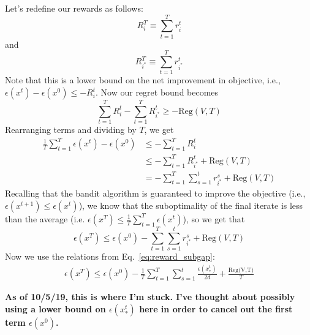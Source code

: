 \documentclass[letterpaper]{article}
\newcommand{\istar}{i^*}
\begin{document}
Let's redefine our rewards as follows:
\begin{equation}
    R_i^T \equiv \sum_{t=1}^T r_i^t
\end{equation}
and
\begin{equation}
    R_{\istar}^T \equiv \sum_{t=1}^T r_{\istar}^t
\end{equation}
Note that this is a lower bound on the net improvement in objective, i.e., $\epsilon(x^t) - \epsilon(x^0) \leq -R_i^t$. Now our regret bound becomes
\begin{equation}
    \sum_{t=1}^T R_i^t -\sum_{t=1}^T R_{\istar}^t \geq -\text{Reg}(V,T)
\end{equation}
Rearranging terms and dividing by $T$, we get
\begin{align}
    \frac{1}{T}\sum_{t=1}^T \epsilon(x^t) - \epsilon(x^0) &\leq -\sum_{t=1}^T R_i^t \\
    &\leq -\sum_{t=1}^T R_{\istar}^t + \text{Reg}(V,T)\\
    &= -\sum_{t=1}^T \sum_{s=1}^t r_{\istar}^s + \text{Reg}(V,T)
\end{align}
Recalling that the bandit algorithm is guaranteed to improve the objective (i.e., $\epsilon(x^{t+1}) \leq \epsilon(x^t)$), we know that the suboptimality of the final iterate is less than the average (i.e. $\epsilon(x^T) \leq \frac{1}{T} \sum_{t=1}^T \epsilon(x^t)$), so we get that
\begin{equation}
    \epsilon(x^T) \leq \epsilon(x^0) -\sum_{t=1}^T \sum_{s=1}^t r_{\istar}^s + \text{Reg}(V,T)
\end{equation}
Now we use the relations from Eq.~\ref{eq:reward_subgap}:
\begin{align}
    \epsilon(x^T) \leq \epsilon(x^0) - \frac{1}{T}\sum_{t=1}^T \sum_{s=1}^t \frac{\epsilon(x^t_*)}{2d} + \frac{\text{Reg(V,T)}}{T}
\end{align}

\textbf{As of 10/5/19, this is where I'm stuck. I've thought about possibly using a lower bound on $\epsilon(x_*^t)$ here in order to cancel out the first term $\epsilon(x^0)$.}


\end{document}
